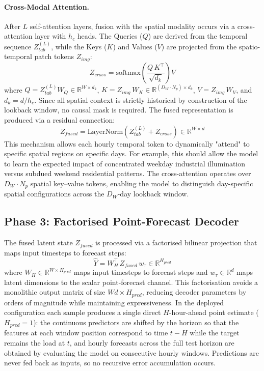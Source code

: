 \paragraph{Cross-Modal Attention.}
After $L$ self-attention layers, fusion with the spatial modality occurs via a cross-attention layer with $h_c$ heads. The Queries ($Q$) are derived from the temporal sequence $Z_{tab}^{(L)}$, while the Keys ($K$) and Values ($V$) are projected from the spatio-temporal patch tokens $Z_{img}$:
\begin{equation}
    Z_{cross} = \text{softmax}\!\left(
    \frac{Q\, K^\top}{\sqrt{d_k}}\right) V
\end{equation}
where $Q = Z_{tab}^{(L)} W_Q \in \mathbb{R}^{W \times d_k}$, $K = Z_{img}\, W_K \in \mathbb{R}^{(D_W \cdot N_p) \times d_k}$, $V = Z_{img}\, W_V$, and $d_k = d / h_c$. Since all spatial context is strictly historical by construction of the lookback window, no causal mask is required. The fused representation is produced via a residual connection:
\begin{equation}
    Z_{fused} = \text{LayerNorm}\!\left(
    Z_{tab}^{(L)} + Z_{cross}\right) \in \mathbb{R}^{W \times d}
\end{equation}
This mechanism allows each hourly temporal token to dynamically "attend" to specific spatial regions on specific days. For example, this should allow the model to learn the expected impact of concentrated weekday industrial illumination versus subdued weekend residential patterns. The cross-attention operates over $D_W \cdot N_p$ spatial key--value tokens, enabling the model to distinguish day-specific spatial configurations across the $D_W$-day lookback window.


\subsection{Phase 3: Factorised Point-Forecast Decoder}

The fused latent state $Z_{fused}$ is processed via a factorised bilinear projection that maps input timesteps to forecast steps:
\begin{equation}
    \hat{Y} = W_H^\top\, Z_{fused}\, w_\tau
    \in \mathbb{R}^{H_{pred}}
\end{equation}
where $W_H \in \mathbb{R}^{W \times H_{pred}}$ maps input timesteps to forecast steps and $w_\tau \in \mathbb{R}^{d}$ maps latent dimensions to the scalar point-forecast channel. This factorisation avoids a monolithic output matrix of size $Wd \times H_{pred}$, reducing decoder parameters by orders of magnitude while maintaining expressiveness. In the deployed configuration each sample produces a single direct $H$-hour-ahead point estimate ($H_{pred} = 1$): the continuous predictors are shifted by the horizon so that the features at each window position correspond to time $t - H$ while the target remains the load at $t$, and hourly forecasts across the full test horizon are obtained by evaluating the model on consecutive hourly windows. Predictions are never fed back as inputs, so no recursive error accumulation occurs.


\clearpage

